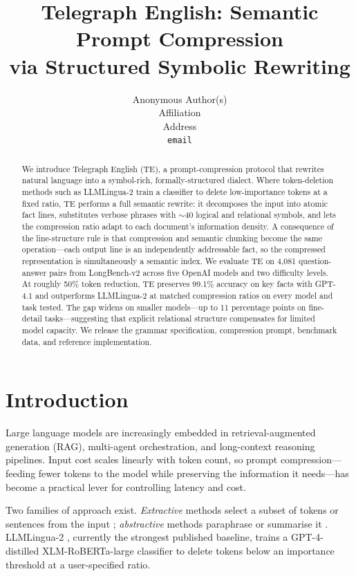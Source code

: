 \documentclass{article}
\title{Telegraph English: Semantic Prompt Compression\\via Structured Symbolic Rewriting}
\author{%
  Anonymous Author(s)\\
  Affiliation\\
  Address\\
  \texttt{email}\\
}
\begin{document}
\maketitle

\begin{abstract}
We introduce Telegraph English (TE), a prompt-compression protocol that rewrites natural language into a symbol-rich, formally-structured dialect. Where token-deletion methods such as LLMLingua-2 train a classifier to delete low-importance tokens at a fixed ratio, TE performs a full semantic rewrite: it decomposes the input into atomic fact lines, substitutes verbose phrases with $\sim$40 logical and relational symbols, and lets the compression ratio adapt to each document's information density. A consequence of the line-structure rule is that compression and semantic chunking become the same operation---each output line is an independently addressable fact, so the compressed representation is simultaneously a semantic index. We evaluate TE on 4{,}081 question-answer pairs from LongBench-v2 across five OpenAI models and two difficulty levels. At roughly 50\% token reduction, TE preserves 99.1\% accuracy on key facts with GPT-4.1 and outperforms LLMLingua-2 at matched compression ratios on every model and task tested. The gap widens on smaller models---up to 11 percentage points on fine-detail tasks---suggesting that explicit relational structure compensates for limited model capacity. We release the grammar specification, compression prompt, benchmark data, and reference implementation.
\end{abstract}

\section{Introduction}
\label{sec:intro}

Large language models are increasingly embedded in retrieval-augmented generation (RAG), multi-agent orchestration, and long-context reasoning pipelines. Input cost scales linearly with token count, so prompt compression---feeding fewer tokens to the model while preserving the information it needs---has become a practical lever for controlling latency and cost.

Two families of approach exist. \emph{Extractive} methods select a subset of tokens or sentences from the input \citep{jiang2023llmlingua,pan2024llmlingua2}; \emph{abstractive} methods paraphrase or summarise it \citep{chevalier2023autocompressors}. LLMLingua-2 \citep{pan2024llmlingua2}, currently the strongest published baseline, trains a GPT-4-distilled XLM-RoBERTa-large classifier to delete tokens below an importance threshold at a user-specified ratio.
\end{document}
